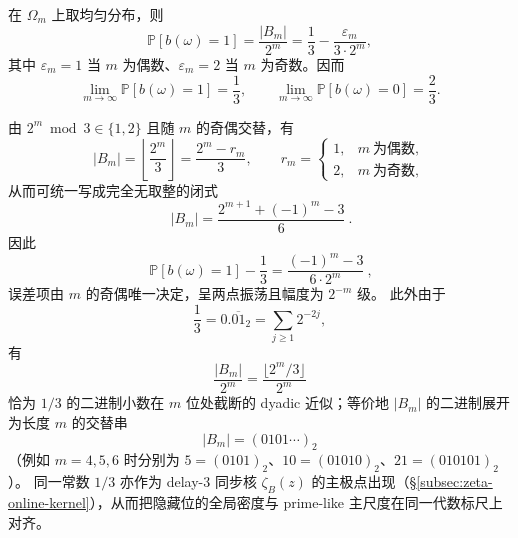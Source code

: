 \begin{corollary}\label{cor:pom-hidden-bit-entropy}
在 $\Omega_m$ 上取均匀分布，则
$$
\mathbb{P}[b(\omega)=1]=\frac{|B_m|}{2^m}
=\frac{1}{3}-\frac{\varepsilon_m}{3\cdot 2^m},
$$
其中 $\varepsilon_m=1$ 当 $m$ 为偶数、$\varepsilon_m=2$ 当 $m$ 为奇数。因而
$$
\lim_{m\to\infty}\mathbb{P}[b(\omega)=1]=\frac{1}{3},\qquad
\lim_{m\to\infty}\mathbb{P}[b(\omega)=0]=\frac{2}{3}.
$$
\end{corollary}

\begin{remark}[去除取整符号的闭式与二进制截断]\label{rem:pom-hidden-bit-dyadic-trunc}
由 \(2^m\bmod 3\in\{1,2\}\) 且随 \(m\) 的奇偶交替，有
\[
|B_m|
=\left\lfloor\frac{2^m}{3}\right\rfloor
=\frac{2^m-r_m}{3},
\qquad
r_m=
\begin{cases}
1,& m\ \text{为偶数},\\
2,& m\ \text{为奇数},
\end{cases}
\]
从而可统一写成完全无取整的闭式
\[
\boxed{\ |B_m|=\frac{2^{m+1}+(-1)^m-3}{6}\ }.
\]
因此
\[
\boxed{\ \mathbb{P}[b(\omega)=1]-\frac13=\frac{(-1)^m-3}{6\cdot 2^m}\ },
\]
误差项由 \(m\) 的奇偶唯一决定，呈两点振荡且幅度为 \(2^{-m}\) 级。
此外由于
\[
\frac13=0.\overline{01}_2=\sum_{j\ge 1}2^{-2j},
\]
有
\[
\frac{|B_m|}{2^m}=\frac{\lfloor 2^m/3\rfloor}{2^m}
\]
恰为 \(1/3\) 的二进制小数在 \(m\) 位处截断的 dyadic 近似；等价地 \(|B_m|\) 的二进制展开为长度 \(m\) 的交替串
\[
|B_m|=(0101\cdots)_2
\]
（例如 \(m=4,5,6\) 时分别为 \(5=(0101)_2\)、\(10=(01010)_2\)、\(21=(010101)_2\)）。
同一常数 \(1/3\) 亦作为 delay-\(3\) 同步核 \(\zeta_B(z)\) 的主极点出现（\S\ref{subsec:zeta-online-kernel}），从而把隐藏位的全局密度与 prime-like 主尺度在同一代数标尺上对齐。
\end{remark}

